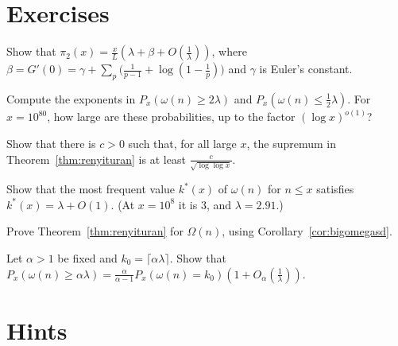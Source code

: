 \section{Exercises}

\begin{exercise}[$\star$]\label{ex:pi2}
Show that $\pi_2(x)=\frac xL(\lambda+\beta+O(\frac1\lambda))$, where $\beta=G'(0)=\gamma+\sum_p\bigl(\frac1{p-1}+\log(1-\frac1p)\bigr)$ and $\gamma$ is Euler's constant.
\end{exercise}

\begin{exercise}[$\star$]\label{ex:ldnumbers}
Compute the exponents in $P_x(\omega(n)\ge2\lambda)$ and $P_x(\omega(n)\le\frac12\lambda)$. For $x=10^{80}$, how large are these probabilities, up to the factor $(\log x)^{o(1)}$?
\end{exercise}

\begin{exercise}[$\star\star$]\label{ex:rateoptimal}
Show that there is $c>0$ such that, for all large $x$, the supremum in Theorem~\ref{thm:renyituran} is at least $\frac c{\sqrt{\log\log x}}$.
\end{exercise}

\begin{exercise}[$\star\star$]\label{ex:mode}
Show that the most frequent value $k^*(x)$ of $\omega(n)$ for $n\le x$ satisfies $k^*(x)=\lambda+O(1)$. (At $x=10^8$ it is $3$, and $\lambda=2.91$.)
\end{exercise}

\begin{exercise}[$\star\star$]\label{ex:renyituranomega}
Prove Theorem~\ref{thm:renyituran} for $\Omega(n)$, using Corollary~\ref{cor:bigomegasd}.
\end{exercise}

\begin{exercise}[$\star\star\star$]\label{ex:tail}
Let $\alpha>1$ be fixed and $k_0=\lceil\alpha\lambda\rceil$. Show that $P_x(\omega(n)\ge\alpha\lambda)=\frac\alpha{\alpha-1}P_x(\omega(n)=k_0)(1+O_\alpha(\frac1\lambda))$.
\end{exercise}

\section{Hints}

